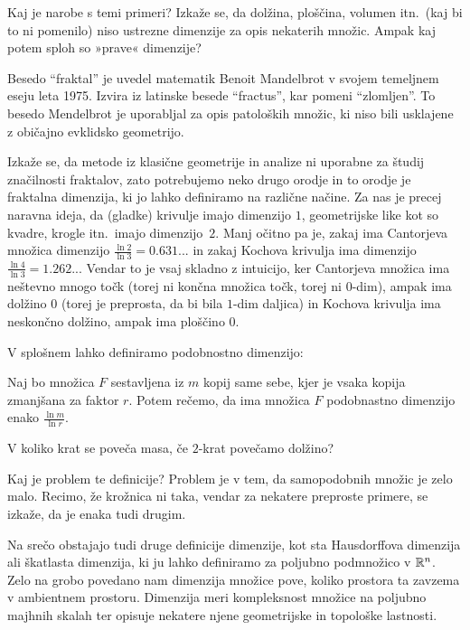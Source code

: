 Kaj je narobe s temi primeri? Izkaže se, da dolžina, ploščina, volumen itn.\ (kaj bi to ni pomenilo) niso ustrezne dimenzije za opis nekaterih množic. Ampak kaj potem sploh so »prave« dimenzije?

\newpage
Besedo "`fraktal"' je uvedel matematik Benoit Mandelbrot v svojem temeljnem eseju leta 1975. Izvira iz latinske besede "`fractus"', kar pomeni "`zlomljen"'. To besedo Mendelbrot je uporabljal za opis patoloških množic, ki niso bili usklajene z običajno evklidsko geometrijo.

Izkaže se, da metode iz klasične geometrije in analize ni uporabne za študij značilnosti fraktalov, zato potrebujemo neko drugo orodje in to orodje je fraktalna dimenzija, ki jo lahko definiramo na različne načine. Za nas je precej naravna ideja, da (gladke) krivulje imajo dimenzijo \(1\), geometrijske like kot so kvadre, krogle itn.\ imajo dimenzijo~\(2\). Manj očitno pa je, zakaj ima Cantorjeva množica dimenzijo \(\frac{\ln 2}{\ln 3} = 0.631...\) in zakaj Kochova krivulja ima dimenzijo \(\frac{\ln 4}{\ln 3} = 1.262...\) Vendar to je vsaj skladno z intuicijo, ker Cantorjeva množica ima neštevno mnogo točk (torej ni končna množica točk, torej ni \(0\)-dim), ampak ima dolžino \(0\) (torej je preprosta, da bi bila \(1\)-dim daljica) in Kochova krivulja ima neskončno dolžino, ampak ima ploščino \(0\).

V splošnem lahko definiramo podobnostno dimenzijo:
\begin{definicija}
    Naj bo množica \(F\) sestavljena iz \(m\) kopij same sebe, kjer je vsaka kopija zmanjšana za faktor \(r\). Potem rečemo, da ima množica \(F\) podobnastno dimenzijo enako \(\frac{\ln m}{\ln r}\).
\end{definicija}

\begin{opomba}
    V koliko krat se poveča masa, če \(2\)-krat povečamo dolžino?
\end{opomba}

Kaj je problem te definicije? Problem je v tem, da samopodobnih množic je zelo malo. Recimo, že krožnica ni taka, vendar za nekatere preproste primere, se izkaže, da je enaka tudi drugim.

Na srečo obstajajo tudi druge definicije dimenzije, kot sta Hausdorffova dimenzija ali škatlasta dimenzija, ki ju lahko definiramo za poljubno podmnožico v \(\mathbb{R}^n\). Zelo na grobo povedano nam dimenzija množice pove, koliko prostora ta zavzema v ambientnem prostoru. Dimenzija meri kompleksnost množice na poljubno majhnih skalah ter opisuje nekatere njene geometrijske in topološke lastnosti.

